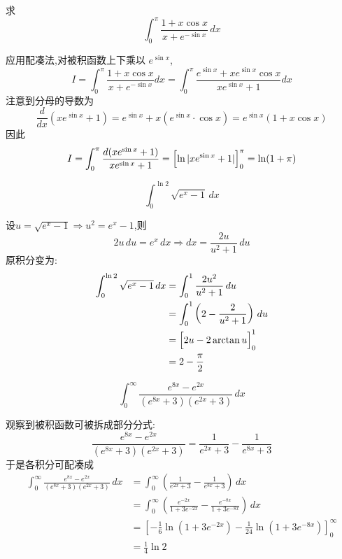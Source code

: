 \begin{questions}
    \question 求
    \[
    \int_{0}^{\pi} \frac{1 + x \cos x}{x + e^{-\sin x}} \, dx
    \]
    \begin{solution}
        应用配凑法,对被积函数上下乘以 $e^{\sin x}$,
        \[
        I=\int_{0}^{\pi} \frac{1+x\cos x}{x+e^{-\sin x}} dx 
        = \int_{0}^{\pi} \frac{e^{\sin x} + xe^{\sin x}\cos x}{xe^{\sin x} + 1} dx
        \]
        注意到分母的导数为
        \[
        \frac{d}{dx}(xe^{\sin x} + 1) = e^{\sin x} + x(e^{\sin x} \cdot \cos x) = e^{\sin x}(1 + x\cos x)
        \]
        因此
        \[
        I=\int_{0}^{\pi} \frac{d(xe^{\sin x} + 1)}{xe^{\sin x} + 1}
        = \Bigl[\ln|xe^{\sin x} + 1|\Bigr]_{0}^{\pi} =\ln(1+\pi)
        \]
    \end{solution}

    \question 
    \[
    \int_{0}^{\ln 2} \sqrt{e^x - 1} \, dx
    \]
    \begin{solution}
        设$u = \sqrt{e^x - 1}\Rightarrow u^2 = e^x - 1$,则
        \[
        2u\,du = e^x \,dx \Rightarrow dx = \frac{2u}{u^2+1} \, du
        \]
        原积分变为:
        \begin{align*}
        \int_{0}^{\ln 2} \sqrt{e^x - 1} \, dx 
        &= \int_{0}^{1} \frac{2u^2}{u^2+1} \, du \\
        &= \int_{0}^{1} \left(2 - \frac{2}{u^2+1}\right) \,du \\
        &= \Bigl[2u - 2\arctan u \Bigr]_{0}^{1} \\
        &= 2 - \frac{\pi}{2}
        \end{align*}
    \end{solution}

    \question 
    \[
    \int_{0}^{\infty} \frac{e^{8x}-e^{2x}}{(e^{8x}+3)(e^{2x}+3)} \, dx
    \]
    \begin{solution}
        观察到被积函数可被拆成部分分式:
        \[
        \frac{e^{8x}-e^{2x}}{(e^{8x}+3)(e^{2x}+3)} = \frac{1}{e^{2x}+3}- \frac{1}{e^{8x}+3}
        \]
        于是各积分可配凑成
        \begin{align*}
        \int_{0}^{\infty} \frac{e^{8x}-e^{2x}}{(e^{8x}+3)(e^{2x}+3)} \, dx 
        &= \int_{0}^{\infty} \left(\frac{1}{e^{2x}+3}- \frac{1}{e^{8x}+3}\right) \, dx \\
        &= \int_{0}^{\infty} \left(\frac{e^{-2x}}{1+3 e^{-2x}} - \frac{e^{-8x}}{1+3 e^{-8x}}\right) \, dx \\
        &= \left[-\frac{1}{6}\ln\left(1+3 e^{-2x}\right) - \frac{1}{24} \ln\left(1+3 e^{-8x}\right)\right]_{0}^{\infty} \\
        &= \frac{1}{4} \ln 2
        \end{align*}
    \end{solution}


\end{questions}
